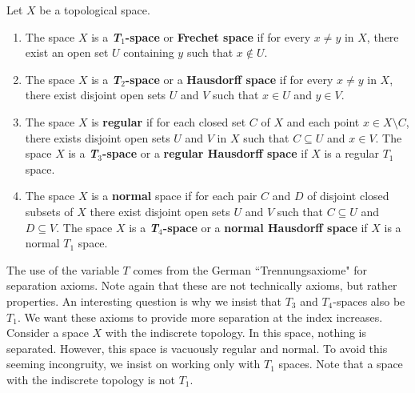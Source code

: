 \begin{definition} Let $X$ be a topological space. 
\begin{enumerate}

\item The space $X$ is a \textbf{\emph{T}$_1$-space} or \textbf{Frechet space} if for every $x\neq y$ in $X$, there exist an open set $U$ containing $y$ such that $x \notin U$.  

\item The space $X$ is a \textbf{\emph{T}$_2$-space} or a \textbf{Hausdorff space} if for every $x\neq y$ in $X$, there exist disjoint open sets $U$ and $V$ such that $x\in U$ and $y\in V$.

\item The space $X$ is \textbf{regular} if for each closed set $C$ of $X$ and each point $x \in X \setminus C$, there exists disjoint open sets $U$ and $V$ in $X$ such that $C \subseteq U$ and $x \in V$. The space $X$ is a \textbf{\emph{T}$_3$-space} or a \textbf{regular Hausdorff space} if $X$ is a regular $T_1$ space. 

\item The space $X$ is a \textbf{normal} space if for each pair $C$ and $D$ of disjoint closed subsets of $X$ there exist disjoint open sets $U$ and $V$ such that $C \subseteq U$ and $D \subseteq V$.  The space $X$ is a \textbf{\emph{T}$_4$-space} or a \textbf{normal Hausdorff space} if $X$ is a normal $T_1$ space. 

\end{enumerate}
\end{definition}
The use of the variable $T$ comes from the German ``Trennungsaxiome" for separation axioms. Note again that these are not technically axioms, but rather properties. An interesting question is why we insist that $T_3$ and $T_4$-spaces also be $T_1$. We want these axioms to provide more separation at the index increases. Consider a space $X$ with the indiscrete topology. In this space, nothing is separated. However, this space is vacuously regular and normal. To avoid this seeming incongruity, we insist on working only with $T_1$ spaces. Note that a space with the indiscrete topology is not $T_1$. 

